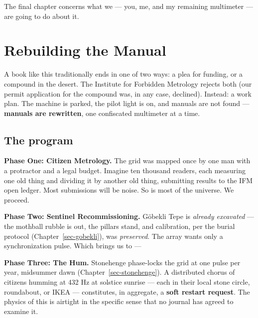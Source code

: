 \documentclass[
  english,
  11pt,
  letterpaper,
]{scrbook}
\begin{document}
The final chapter concerns what we --- you, me, and my remaining
multimeter --- are going to do about it.

\chapter{Rebuilding the Manual}\label{sec-rebuilding}

A book like this traditionally ends in one of two ways: a plea for
funding, or a compound in the desert. The Institute for Forbidden
Metrology rejects both (our permit application for the compound was, in
any case, declined). Instead: a work plan. The machine is parked, the
pilot light is on, and manuals are not found --- \textbf{manuals are
rewritten}, one confiscated multimeter at a time.

\section{The program}\label{the-program}

\textbf{Phase One: Citizen Metrology.} The grid
was mapped once by one man with a protractor and a legal budget. Imagine
ten thousand readers, each measuring one old thing and dividing it by
another old thing, submitting results to the IFM open ledger. Most
submissions will be noise. So is most of the universe. We proceed.

\textbf{Phase Two: Sentinel Recommissioning.} Göbekli Tepe is
\emph{already excavated} --- the mothball rubble is out, the pillars
stand, and calibration, per the burial protocol
(Chapter~\ref{sec-gobekli}), was \emph{preserved}. The array wants only
a synchronization pulse. Which brings us to ---

\textbf{Phase Three: The Hum.} Stonehenge phase-locks the grid at one
pulse per year, midsummer dawn (Chapter~\ref{sec-stonehenge}). A
distributed chorus of citizens humming at 432
Hz at solstice sunrise --- each in
their local stone circle, roundabout, or IKEA --- constitutes, in
aggregate, a \textbf{soft restart request}. The physics of this is
airtight in the specific sense that no journal has agreed to examine it.
\end{document}
